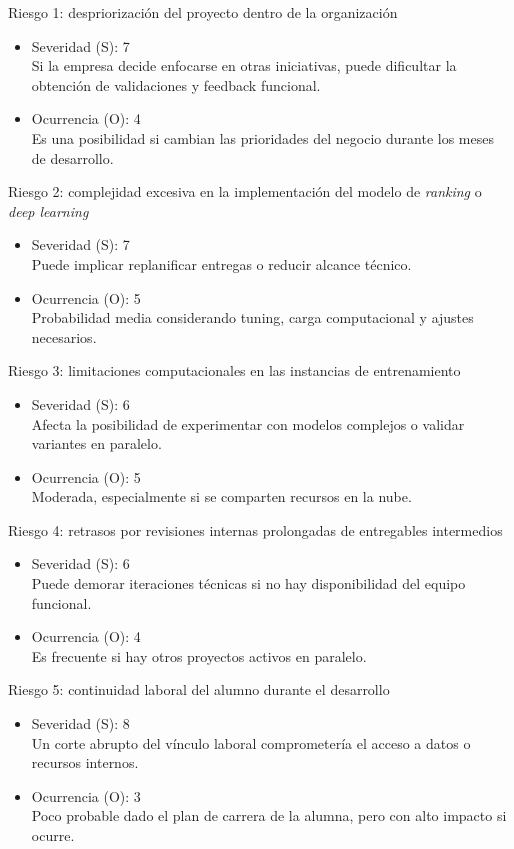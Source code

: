 \documentclass[
11pt, %
]{charter}
\begin{document}
Riesgo 1: despriorización del proyecto dentro de la organización
\begin{itemize}
  \item Severidad (S): 7 \\
  Si la empresa decide enfocarse en otras iniciativas, puede dificultar la obtención de validaciones y feedback funcional.
  \item Ocurrencia (O): 4 \\
  Es una posibilidad si cambian las prioridades del negocio durante los meses de desarrollo.
\end{itemize}

Riesgo 2: complejidad excesiva en la implementación del modelo de \textit{ranking} o \textit{deep learning}
\begin{itemize}
  \item Severidad (S): 7 \\
  Puede implicar replanificar entregas o reducir alcance técnico.
  \item Ocurrencia (O): 5 \\
  Probabilidad media considerando tuning, carga computacional y ajustes necesarios.
\end{itemize}

Riesgo 3: limitaciones computacionales en las instancias de entrenamiento
\begin{itemize}
  \item Severidad (S): 6 \\
  Afecta la posibilidad de experimentar con modelos complejos o validar variantes en paralelo.
  \item Ocurrencia (O): 5 \\
  Moderada, especialmente si se comparten recursos en la nube.
\end{itemize}

Riesgo 4: retrasos por revisiones internas prolongadas de entregables intermedios
\begin{itemize}
  \item Severidad (S): 6 \\
  Puede demorar iteraciones técnicas si no hay disponibilidad del equipo funcional.
  \item Ocurrencia (O): 4 \\
  Es frecuente si hay otros proyectos activos en paralelo.
\end{itemize}

Riesgo 5: continuidad laboral del alumno durante el desarrollo
\begin{itemize}
  \item Severidad (S): 8 \\
  Un corte abrupto del vínculo laboral comprometería el acceso a datos o recursos internos.
  \item Ocurrencia (O): 3 \\
  Poco probable dado el plan de carrera de la alumna, pero con alto impacto si ocurre.
\end{itemize}
\end{document}

